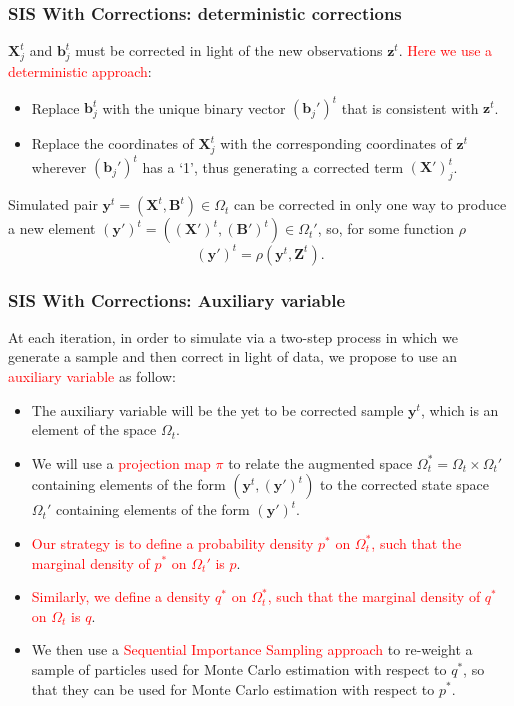 \documentclass[9pt, xcolor={dvipsnames,svgnames,table}]{beamer}
\begin{document}
    
    
    
    
    
\begin{frame}
    \frametitle{SIS With Corrections: deterministic corrections}
    $\bm{X}^{t}_j$ and $\bm{b}^{t}_j$ must be corrected in light of the new observations $\bm{z}^{t}$. \textcolor{Red}{Here we use a deterministic approach}: 
    \begin{itemize}
        \item Replace $\bm{b}^{t}_j$ with the unique binary vector $(\bm{b}_j')^{t}$ that is consistent with $\bm{z}^{t}$.
        \item Replace the coordinates of $\bm{X}^{t}_j$ with the corresponding coordinates of $\bm{z}^{t}$ wherever $(\bm{b}_j')^{t}$ has a `1', thus generating a corrected term $\bm{(X')}^{t}_j$.
    \end{itemize}  
    Simulated pair $\bm{y}^{t} = (\bm{X}^{t}, \bm{B}^{t}) \in \Omega_t$ can be corrected in only one way to produce a new element $\bm{(y')}^{t} = (\bm{(X')}^t, \bm{(B')}^t) \in \Omega_t'$, so, for some function $\rho$
    \begin{equation*}
        \bm{(y')}^{t} = \rho(\bm{y}^{t},\bm{Z}^{t}).
    \end{equation*}
\end{frame}





\begin{frame}
    \frametitle{SIS With Corrections: Auxiliary variable}
    At each iteration, in order to simulate via a two-step process in which we generate a sample and then correct in light of data, we propose to use an \textcolor{Red}{auxiliary variable} as follow:
    \begin{itemize}
        \item The auxiliary variable will be the yet to be corrected sample $\bm{y}^{t}$, which is an element of the space $\Omega_t$.
        \item We will use a \textcolor{Red}{projection map $\pi$} to relate the augmented space $\Omega^*_t = \Omega_t \times \Omega_t'$ containing elements of the form $(\bm{y}^{t}, \bm{(y')}^{t})$ to the corrected state space $\Omega_t'$ containing elements of the form $\bm{(y')}^{t}$.
        \item \textcolor{Red}{Our strategy is to define a probability density $p^*$ on $\Omega^*_t$, such that the marginal density of $p^*$ on $\Omega_t'$ is $p$}.
        \item \textcolor{Red}{Similarly, we define a density $q^*$ on $\Omega^*_t$, such that the marginal density of $q^*$ on $\Omega_t$ is $q$}.
        \item We then use a \textcolor{Red}{Sequential Importance Sampling approach} to re-weight a sample of particles used for Monte Carlo estimation with respect to $q^*$, so that they can be used for Monte Carlo estimation with respect to $p^*$.
    \end{itemize}
\end{frame}
\end{document}
